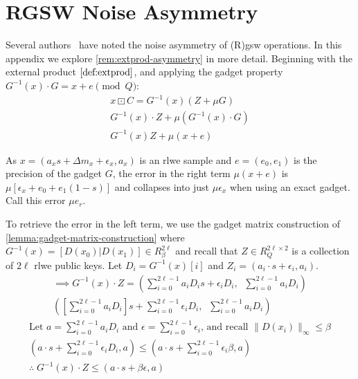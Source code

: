 \chapter{RGSW Noise Asymmetry}
\label{appendix:asymmetry}
Several authors~\cite{cryptoeprint:2013/541, cryptoeprint:2014/094, cryptoeprint:2014/816, cryptoeprint:2018/421} have noted the noise asymmetry of (R)\gls{gsw} operations. In this appendix we explore \autoref{rem:extprod-asymmetry} in more detail. Beginning with the external product $\eqref{def:extprod}$, and applying the gadget property $G^{-1}(x)\cdot G = x + e \pmod{Q}$:
\begin{gather*}
    x\boxdot C = G^{-1}(x)(Z + \mu G) \\ %
    G^{-1}(x)\cdot Z + \mu(G^{-1}(x)\cdot G) \\
    G^{-1}(x)Z + \mu(x + e)
\end{gather*}

As $x = (a_xs + \Delta m_x + \epsilon_x, a_x)$ is an \gls{rlwe} sample and $e = (e_0, e_1)$ is the precision of the gadget $G$, the error in the right term $\mu(x + e)$ is $\mu[\epsilon_x + e_0 + e_1(1 - s)]$ and collapses into just $\mu\epsilon_x$ when using an exact gadget. Call this error $\mu e_r$.

To retrieve the error in the left term, we use the gadget matrix construction of \autoref{lemma:gadget-matrix-construction} where $G^{-1}(x) = [D(x_0)|D(x_1)] \in R_\beta^{2\ell}$ and recall that $Z\in R_Q^{2\ell\times 2}$ is a collection of $2\ell$ \gls{rlwe} public keys. Let $D_i = G^{-1}(x)[i]$ and $Z_i = (a_i\cdot s + \epsilon_i, a_i)$.
\begin{gather*}
    \implies  G^{-1}(x)\cdot Z = \left(\sum_{i=0}^{2\ell - 1} a_i D_i s + \epsilon_i D_i, \;\; \sum_{i=0}^{2\ell - 1} a_i D_i\right)
    \\
        \left(\left[\sum_{i=0}^{2\ell - 1} a_i D_i \right]s + \sum_{i=0}^{2\ell - 1}\epsilon_i D_i, \;\; \sum_{i=0}^{2\ell - 1} a_i D_i\right)
\end{gather*}
\begin{gather*}
    \text{Let } a = \sum_{i=0}^{2\ell - 1} a_i D_i \text{ and } \epsilon = \sum_{i=0}^{2\ell - 1}\epsilon_i \text{, and recall } \|D(x_i)\|_\infty \leq \beta
    \\
    (a\cdot s + \sum_{i=0}^{2\ell - 1}\epsilon_i D_i, a) \leq (a\cdot s + \sum_{i=0}^{2\ell - 1}\epsilon_i \beta, a)
    \\
    \therefore\; G^{-1}(x)\cdot Z \leq (a\cdot s + \beta \epsilon, a)
\end{gather*}

